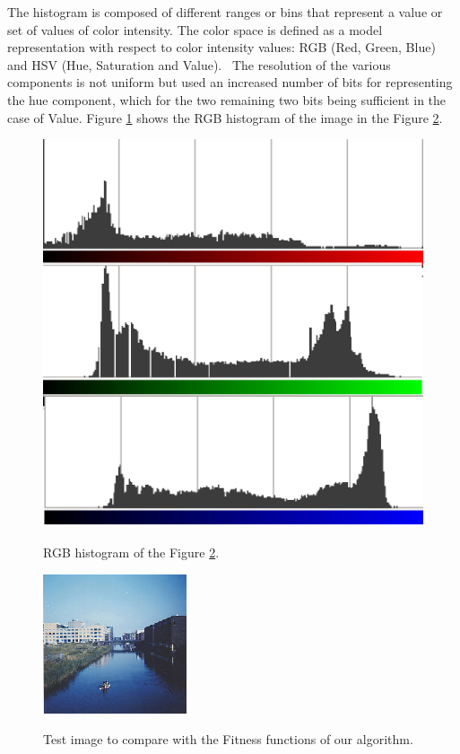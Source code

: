 \documentclass[conference]{IEEEtran}
\begin{document}
The histogram is composed of different ranges or bins that represent a value or set of values ​​of color intensity. The color space is defined as a model representation with respect to color intensity values: RGB (Red, Green, Blue) and HSV (Hue, Saturation and Value).  The resolution of the various components is not uniform but used an increased number of bits for representing the hue component, which for the two remaining two bits being sufficient in the case of Value. Figure \ref{fig:histogram} shows the RGB histogram of the image in the Figure \ref{fig:flevopark}.

\begin{figure}
\centering
   \includegraphics[scale =0.6] {images/histogram.eps}
\label{fig:histogram}
\caption{RGB histogram of the Figure \ref{fig:flevopark}. }
\end{figure}

\begin{figure}
\centering
   \includegraphics[scale =3] {images/flevopark.eps}
\label{fig:flevopark}
\caption{Test image to compare with the Fitness functions of our algorithm.}
\end{figure}
\end{document}
